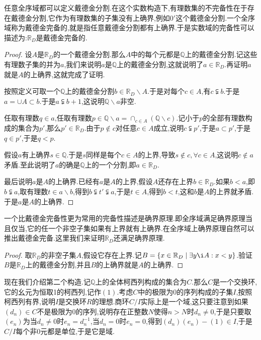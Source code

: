 任意全序域都可以定义戴德金分割.在这个实数构造下,有理数集的不完备性在于存在戴德金分割,它作为有理数集的子集没有上确界,例如$0'$这个戴德金分割.一个全序域称为戴德金完备的,就是指任意戴德金分割都有上确界.于是实数域的完备性可以描述为:$\mathbb{R}_D$是戴德金完备的.
\begin{proof}
	
	设$A$是$\mathbb{R}_D$的一个戴德金分割.那么$A$中的每个元都是$\mathbb{Q}$上的戴德金分割.记这些有理数子集的并为$a$,我们来说明$a$是$\mathbb{Q}$上的戴德金分割,这就说明了$a\in\mathbb{R}_D$.再证明$a$就是$A$的上确界,这就完成了证明.
	
	按照定义可取一个$\mathbb{Q}$上的戴德金分割$b\in\mathbb{R}_D\backslash A$.于是对每个$c\in A$,有$c\subsetneqq b$.于是$a=\cup A\subset b$.于是$a\subsetneqq b+1$,这说明$\mathbb{Q}\backslash a$非空.
	
	任取有理数$q\in a$,任取有理数$p\in\mathbb{Q}\backslash a=\cap_{c\in A}(\mathbb{Q}\backslash c)$.记小于$p$的全部有理数构成的集合为$p'$,那么$p'\in\mathbb{R}_D$.由于$p\not\in c$对任意$c\in A$成立,说明$c\subsetneqq p'$,于是$a\subset p'$,于是$q\in p'$,于是$q<p$.
	
	假设$a$有上确界$s\in\mathbb{Q}$.于是$s$同样是每个$c\in A$的上界,导致$s\not\in c,\forall c\in A$,这说明$c\not\in a$矛盾.至此说明了$a$的确是$\mathbb{Q}$上的一个分割,即$a\in\mathbb{R}_D$.
	
	最后说明$a$是$A$的上确界.已经有$a$是$A$的上界,假设$A$还存在上界$b\in\mathbb{R}_D$.如果$b<a$,即$b\subsetneqq a$,取有理数$t\in a\backslash b$,得到$b\subsetneqq t'\subsetneqq a$,于是$t\in A$,得到$b<t$,这和$b$是$A$的上界就矛盾.于是$a$是$A$的上确界.
\end{proof}

一个比戴德金完备性更为常用的完备性描述是确界原理.即全序域满足确界原理当且仅当,它的任一个非空子集如果有上界就有上确界.在全序域上确界原理自然可以推出戴德金完备.这里我们来证明$\mathbb{R}_D$还满足确界原理.
\begin{proof}
	
	取$\mathbb{R}_D$的非空子集$A$,假设它存在上界.记$B=\{x\in\mathbb{R}_D\mid\exists y\i A:x<y\}$.验证$B$是$\mathbb{R}_D$上的戴德金分割,并且$B$的上确界就是$A$的上确界.
\end{proof}

现在我们介绍第二个构造.记$\mathbb{Q}$上的全体柯西列构成的集合为$C$.那么$C$是一个交换环,它的幺元为恒取1的柯西列,记作$(1)$.考虑$C$中的极限为0的序列构成的子集$I$,按照柯西列有界,说明$I$是交换环$R$的理想.商环$C/I$实际上是一个域,这只要注意到如果$(d_n)\in C$不是极限为0的序列,说明存在正整数$N$使得$n>N$时$d_n\not=0$,于是只要取$(e_n)$为当$d_n\not=0$时$e_n=d_n^{-1}$,当$d_n=0$时$e_n=0$,得到$(d_n)(e_n)-(1)\in I$,于是$C/I$每个非0元都是单位,于是它是域.

